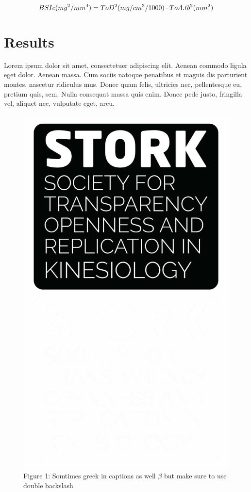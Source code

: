 \documentclass[]{cik}%
\begin{document}
\[
BSIc \space (mg^2/mm^4) = ToD^2 \space (mg/cm^3/1000) \cdot ToA.tb^2 \space (mm^2) \space 
\]

\newpage

\hypertarget{results}{%
\section{Results}\label{results}}

Lorem ipsum dolor sit amet, consectetuer adipiscing elit. Aenean commodo
ligula eget dolor. Aenean massa. Cum sociis natoque penatibus et magnis
dis parturient montes, nascetur ridiculus mus. Donec quam felis,
ultricies nec, pellentesque eu, pretium quis, sem. Nulla consequat massa
quis enim. Donec pede justo, fringilla vel, aliquet nec, vulputate eget,
arcu.

\begin{figure}[H]
\includegraphics[width=1\linewidth]{STORK_overlay_blk} \caption{Figure 1: Somtimes greek in captions as well $\beta$ but make sure to use double backslash}\label{fig:fig1pdf}
\end{figure}
\end{document}
